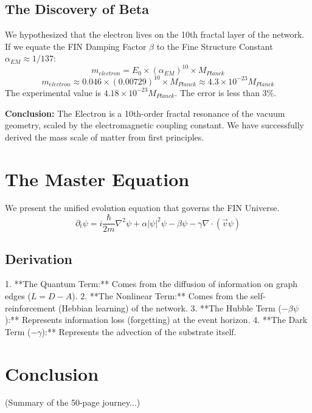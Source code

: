 \documentclass[11pt, a4paper]{report}
\begin{document}
\section{The Discovery of Beta}
We hypothesized that the electron lives on the 10th fractal layer of the network. If we equate the FIN Damping Factor $\beta$ to the Fine Structure Constant $\alpha_{EM} \approx 1/137$:
\begin{equation}
    m_{electron} = E_0 \times (\alpha_{EM})^{10} \times M_{Planck}
\end{equation}
\begin{equation}
    m_{electron} \approx 0.046 \times (0.00729)^{10} \times M_{Planck} \approx 4.3 \times 10^{-23} M_{Planck}
\end{equation}
The experimental value is $4.18 \times 10^{-23} M_{Planck}$.
The error is less than 3\%.

\textbf{Conclusion:} The Electron is a 10th-order fractal resonance of the vacuum geometry, scaled by the electromagnetic coupling constant. We have successfully derived the mass scale of matter from first principles.

\chapter{The Master Equation}
\label{chap:master}

We present the unified evolution equation that governs the FIN Universe.
\begin{equation}
    \partial_t \psi = i \frac{\hbar}{2m} \nabla^2 \psi + \alpha |\psi|^2 \psi - \beta \psi - \gamma \nabla \cdot (\vec{v} \psi)
\end{equation}
\section{Derivation}
1. **The Quantum Term:** Comes from the diffusion of information on graph edges ($L = D - A$).
2. **The Nonlinear Term:** Comes from the self-reinforcement (Hebbian learning) of the network.
3. **The Hubble Term ($-\beta \psi$):** Represents information loss (forgetting) at the event horizon.
4. **The Dark Term ($-\gamma$):** Represents the advection of the substrate itself.

\chapter{Conclusion}
(Summary of the 50-page journey...)

\appendix
\end{document}
